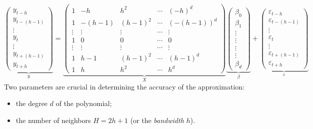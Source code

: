 \documentclass[
  12pt,
  ,
  a4paper]{article}
\newcommand\1{\mathds{1}}
\begin{document}
\[
\underbrace{\begin{pmatrix}y_{t-h}\\
y_{t-(h-1)}\\
\vdots\\
y_{t}\\
\vdots\\
y_{t+(h-1)}\\
y_{t+h}
\end{pmatrix}}_{y}=\underbrace{\begin{pmatrix}1 & -h & h^{2} & \cdots & (-h)^{d}\\
1 & -(h-1) & (h-1)^{2} & \cdots & (-(h-1))^{d}\\
\vdots & \vdots & \vdots & \cdots & \vdots\\
1 & 0 & 0 & \cdots & 0\\
\vdots & \vdots & \vdots & \cdots & \vdots\\
1 & h-1 & (h-1)^{2} & \cdots & (h-1)^{d}\\
1 & h & h^{2} & \cdots & h^{d}
\end{pmatrix}}_{X}\underbrace{\begin{pmatrix}\beta_{0}\\
\beta_{1}\\
\vdots\\
\vdots\\
\vdots\\
\vdots\\
\beta_{d}
\end{pmatrix}}_{\beta}+\underbrace{\begin{pmatrix}\varepsilon_{t-h}\\
\varepsilon_{t-(h-1)}\\
\vdots\\
\varepsilon_{t}\\
\vdots\\
\varepsilon_{t+(h-1)}\\
\varepsilon_{t+h}
\end{pmatrix}}_{\varepsilon}
\]
Two parameters are crucial in determining the accuracy of the approximation:

\begin{itemize}
\item
  the degree \(d\) of the polynomial;
\item
  the number of neighbors \(H=2h+1\) (or the \emph{bandwidth} \(h\)).
\end{itemize}
\end{document}
